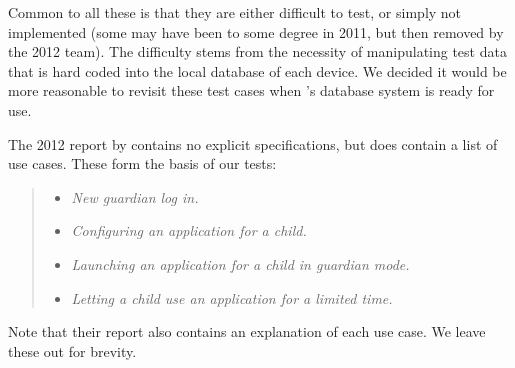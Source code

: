 Common to all these is that they are either difficult to test, or simply not implemented (some may have been to some degree in 2011, but then removed by the 2012 team).
The difficulty stems from the necessity of manipulating test data that is hard coded into the local database of each device. 
We decided it would be more reasonable to revisit these test cases when \giraf's database system is ready for use.

The 2012 report by \citet{launcher2012} contains no explicit specifications, but does contain a list of use cases. 
These form the basis of our tests:

\begin{quote}
\begin{itemize}
	\item \textit{New guardian log in.}
	\item \textit{Configuring an application for a child.}
	\item \textit{Launching an application for a child in guardian mode.}
	\item \textit{Letting a child use an application for a limited time.}
\end{itemize}
\end{quote}

Note that their report also contains an explanation of each use case. 
We leave these out for brevity.